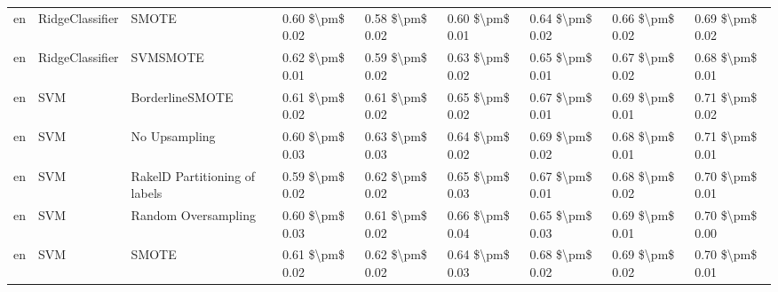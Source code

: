 \begin{tabular}{lllllllll}
      en &                 RidgeClassifier &                         SMOTE &     0.60 \$\textbackslash pm\$ 0.02 &           0.58 \$\textbackslash pm\$ 0.02 &       0.60 \$\textbackslash pm\$ 0.01 &        0.64 \$\textbackslash pm\$ 0.02 &                         0.66 \$\textbackslash pm\$ 0.02 &     0.69 \$\textbackslash pm\$ 0.02 \\
      en &                 RidgeClassifier &                      SVMSMOTE &     0.62 \$\textbackslash pm\$ 0.01 &           0.59 \$\textbackslash pm\$ 0.02 &       0.63 \$\textbackslash pm\$ 0.02 &        0.65 \$\textbackslash pm\$ 0.01 &                         0.67 \$\textbackslash pm\$ 0.02 &     0.68 \$\textbackslash pm\$ 0.01 \\
      en &                             SVM &               BorderlineSMOTE &     0.61 \$\textbackslash pm\$ 0.02 &           0.61 \$\textbackslash pm\$ 0.02 &       0.65 \$\textbackslash pm\$ 0.02 &        0.67 \$\textbackslash pm\$ 0.01 &                         0.69 \$\textbackslash pm\$ 0.01 &     0.71 \$\textbackslash pm\$ 0.02 \\
      en &                             SVM &                 No Upsampling &     0.60 \$\textbackslash pm\$ 0.03 &           0.63 \$\textbackslash pm\$ 0.03 &       0.64 \$\textbackslash pm\$ 0.02 &        0.69 \$\textbackslash pm\$ 0.02 &                         0.68 \$\textbackslash pm\$ 0.01 &     0.71 \$\textbackslash pm\$ 0.01 \\
      en &                             SVM & RakelD Partitioning of labels &     0.59 \$\textbackslash pm\$ 0.02 &           0.62 \$\textbackslash pm\$ 0.02 &       0.65 \$\textbackslash pm\$ 0.03 &        0.67 \$\textbackslash pm\$ 0.01 &                         0.68 \$\textbackslash pm\$ 0.02 &     0.70 \$\textbackslash pm\$ 0.01 \\
      en &                             SVM &           Random Oversampling &     0.60 \$\textbackslash pm\$ 0.03 &           0.61 \$\textbackslash pm\$ 0.02 &       0.66 \$\textbackslash pm\$ 0.04 &        0.65 \$\textbackslash pm\$ 0.03 &                         0.69 \$\textbackslash pm\$ 0.01 &     0.70 \$\textbackslash pm\$ 0.00 \\
      en &                             SVM &                         SMOTE &     0.61 \$\textbackslash pm\$ 0.02 &           0.62 \$\textbackslash pm\$ 0.02 &       0.64 \$\textbackslash pm\$ 0.03 &        0.68 \$\textbackslash pm\$ 0.02 &                         0.69 \$\textbackslash pm\$ 0.02 &     0.70 \$\textbackslash pm\$ 0.01 \\

\end{tabular}
